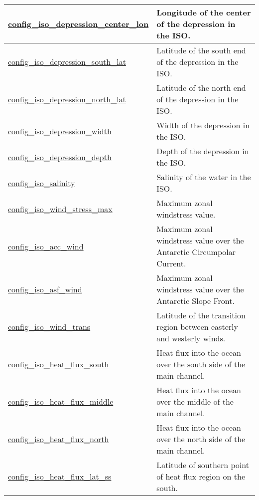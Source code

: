 {\begin{center}
\begin{longtable}{| p{2.0in} || p{4.0in} |}
    \hline
    \hyperref[subsec:nm_sec_config_iso_depression_center_lon]{config\_iso\_depression\_center\_\-lon} & Longitude of the center of the depression in the ISO. \\
    \hline
    \hyperref[subsec:nm_sec_config_iso_depression_south_lat]{config\_iso\_depression\_south\_\-lat} & Latitude of the south end of the depression in the ISO. \\
    \hline
    \hyperref[subsec:nm_sec_config_iso_depression_north_lat]{config\_iso\_depression\_north\_\-lat} & Latitude of the north end of the depression in the ISO. \\
    \hline
    \hyperref[subsec:nm_sec_config_iso_depression_width]{config\_iso\_depression\_width} & Width of the depression in the ISO. \\
    \hline
    \hyperref[subsec:nm_sec_config_iso_depression_depth]{config\_iso\_depression\_depth} & Depth of the depression in the ISO. \\
    \hline
    \hyperref[subsec:nm_sec_config_iso_salinity]{config\_iso\_salinity} & Salinity of the water in the ISO. \\
    \hline
    \hyperref[subsec:nm_sec_config_iso_wind_stress_max]{config\_iso\_wind\_stress\_max} & Maximum zonal windstress value. \\
    \hline
    \hyperref[subsec:nm_sec_config_iso_acc_wind]{config\_iso\_acc\_wind} & Maximum zonal windstress value over the Antarctic Circumpolar Current. \\
    \hline
    \hyperref[subsec:nm_sec_config_iso_asf_wind]{config\_iso\_asf\_wind} & Maximum zonal windstress value over the Antarctic Slope Front. \\
    \hline
    \hyperref[subsec:nm_sec_config_iso_wind_trans]{config\_iso\_wind\_trans} & Latitude of the transition region between easterly and westerly winds. \\
    \hline
    \hyperref[subsec:nm_sec_config_iso_heat_flux_south]{config\_iso\_heat\_flux\_south} & Heat flux into the ocean over the south side of the main channel. \\
    \hline
    \hyperref[subsec:nm_sec_config_iso_heat_flux_middle]{config\_iso\_heat\_flux\_middle} & Heat flux into the ocean over the middle of the main channel. \\
    \hline
    \hyperref[subsec:nm_sec_config_iso_heat_flux_north]{config\_iso\_heat\_flux\_north} & Heat flux into the ocean over the north side of the main channel. \\
    \hline
    \hyperref[subsec:nm_sec_config_iso_heat_flux_lat_ss]{config\_iso\_heat\_flux\_lat\_ss} & Latitude of southern point of heat flux region on the south. \\

\end{longtable}
\end{center}}

